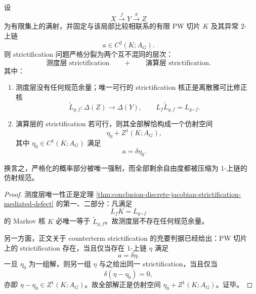 \begin{theorem}\label{thm:conclusion-strictification-bilayer-measure-affine-gauge}
设
\[
X\xrightarrow{f}Y\xrightarrow{g}Z
\]
为有限集上的满射，并固定与该局部比较相联系的有限 PW 切片 \(K\) 及其异常 \(2\)-上链
\[
a\in C^2(K;A_G).
\]
则 strictification 问题严格分裂为两个互不混同的层次：
\[
\text{测度层 strictification}
\qquad+\qquad
\text{演算层 strictification}.
\]
其中：
\begin{enumerate}
  \item 测度层没有任何规范余量；唯一可行的 strictification 核正是离散雅可比修正核
  \[
  \widetilde L_{g,f}:\Delta(Z)\to\Delta(Y),
  \qquad
  L_f\widetilde L_{g,f}=L_{g\circ f}.
  \]
  \item 演算层的 strictification 若可行，则其全部解恰构成一个仿射空间
  \[
  \eta_0+Z^1(K;A_G),
  \]
  其中 \(\eta_0\in C^1(K;A_G)\) 满足
  \[
  a=\delta\eta_0.
  \]
\end{enumerate}
换言之，严格化的概率部分被唯一强制，而全部剩余自由度都被压缩为 \(1\)-上链的仿射规范。
\end{theorem}
\begin{proof}
测度层唯一性正是定理 \ref{thm:conclusion-discrete-jacobian-strictification-mediated-defect} 的第一、二部分：凡满足
\[
L_fK=L_{g\circ f}
\]
的 Markov 核 \(K\) 必唯一等于 \(\widetilde L_{g,f}\)。故测度层不存在任何规范余量。

另一方面，正文关于 counterterm strictification 的充要判据已经给出：PW 切片上的 strictification 存在，当且仅当存在 \(1\)-上链 \(\eta\) 满足
\[
a=\delta\eta.
\]
一旦 \(\eta_0\) 为一组解，则另一组 \(\eta\) 与之给出同一 strictification，当且仅当
\[
\delta(\eta-\eta_0)=0,
\]
亦即 \(\eta-\eta_0\in Z^1(K;A_G)\)。故全部解正是仿射空间 \(\eta_0+Z^1(K;A_G)\)。证毕。
\end{proof}

